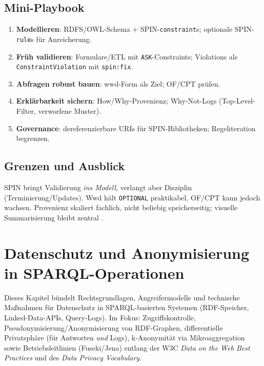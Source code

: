 \subsection{Mini-Playbook}
\begin{enumerate}
  \item \textbf{Modellieren}: RDFS/OWL-Schema + SPIN-\texttt{constraint}s; optionale SPIN-\texttt{rule}s für Anreicherung.
  \item \textbf{Früh validieren}: Formulare/ETL mit \texttt{ASK}-Constraints; Violations als \texttt{ConstraintViolation} mit \texttt{spin:fix}.
  \item \textbf{Abfragen robust bauen}: wwd-Form als Ziel; OF/CPT prüfen.
  \item \textbf{Erklärbarkeit sichern}: How/Why-Provenienz; Why-Not-Logs (Top-Level-Filter, verworfene Muster).
  \item \textbf{Governance}: dereferenzierbare URIs für SPIN-Bibliotheken; Regeliteration begrenzen.
\end{enumerate}

\subsection{Grenzen und Ausblick}
SPIN bringt Validierung \emph{ins Modell}, verlangt aber Disziplin (Terminierung/Updates). Wwd hält \texttt{OPTIONAL} praktikabel, OF/CPT kann jedoch wachsen. Provenienz skaliert fachlich, nicht beliebig speicherseitig; visuelle Summarisierung bleibt zentral \cite{herschel-survey}. 






\section{Datenschutz und Anonymisierung in SPARQL-Operationen}
\label{sec:privacy}

Dieses Kapitel bündelt Rechtsgrundlagen, Angreifermodelle und technische Maßnahmen für Datenschutz in SPARQL-basierten Systemen (RDF-Speicher, Linked-Data-APIs, Query-Logs). Im Fokus: Zugriffskontrolle, Pseudonymisierung/Anonymisierung von RDF-Graphen, differentielle Privatsphäre (für Antworten \emph{und} Logs), k-Anonymität via Mikroaggregation sowie Betriebsleitlinien (Fuseki/Jena) entlang der W3C \emph{Data on the Web Best Practices} und des \emph{Data Privacy Vocabulary}.

